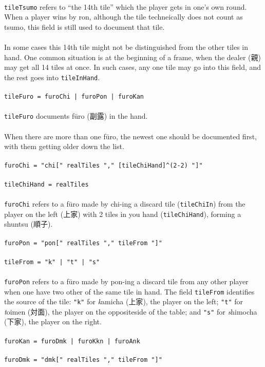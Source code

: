 \documentclass[%
	a4paper%
	,10pt%
	,twoside%
	,notitlepage%
]{article}%
\newcommand*{\ruleSymbol}{\textjapanese{⚠}}%
\newcommand*{\ruleMargin}{\marginpar{\flushright{}\ruleSymbol{}}}%
\newcommand*{\rulePar}{\paragraph*{\ruleMargin{}}}%
\begin{document}
			\paragraph*{}\lstinline/tileTsumo/ refers to ``the 14th tile'' which the player gets in one's own round. When a player wins by ron, although the tile techneically does not count as tsumo, this field is still used to document that tile. %
			\paragraph*{}In some cases this 14th tile might not be distinguished from the other tiles in hand. One common situation is at the beginning of a frame, when the dealer (\textjapanese{親}) may get all 14 tiles at once. In such cases, any one tile may go into this field, and the rest goes into \lstinline/tileInHand/. %
			\rulePar{}\lstinline/tileFuro = furoChi | furoPon | furoKan/%
			\paragraph*{}\lstinline/tileFuro/ documents f\={u}ro (\textjapanese{副露}) in the hand. %
			\rulePar{}When there are more than one f\={u}ro, the newest one should be documented first, with them getting older down the list. %
			\rulePar{}\lstinline/furoChi = "chi[" realTiles "," [tileChiHand]^(2-2) "]"/%
			\rulePar{}\lstinline/tileChiHand = realTiles/%
			\paragraph*{}\lstinline/furoChi/ refers to a f\={u}ro made by chi-ing a discard tile (\lstinline/tileChiIn/) from the player on the left (\textjapanese{上家}) with 2 tiles in you hand (\lstinline/tileChiHand/), forming a shuntsu (\textjapanese{順子}). %
			\rulePar{}\lstinline/furoPon = "pon[" realTiles "," tileFrom "]"/%
			\rulePar{}\lstinline/tileFrom = "k" | "t" | "s"/%
			\paragraph*{}\lstinline/furoPon/ refers to a f\={u}ro made by pon-ing a discard tile from any other player when one have two other of the same tile in hand. The field \lstinline/tileFrom/ identifies the source of the tile: \lstinline/"k"/ for \textit{k\/}amicha (\textjapanese{上家}), the player on the left; \lstinline/"t"/ for \textit{t\/}oimen (\textjapanese{対面}), the player on the oppositeside of the table; and \lstinline/"s"/ for \textit{s\/}himocha (\textjapanese{下家}), the player on the right. %
			\rulePar{}\lstinline/furoKan = furoDmk | furoKkn | furoAnk/%
			\rulePar{}\lstinline/furoDmk = "dmk[" realTiles "," tileFrom "]"/%
\end{document}
